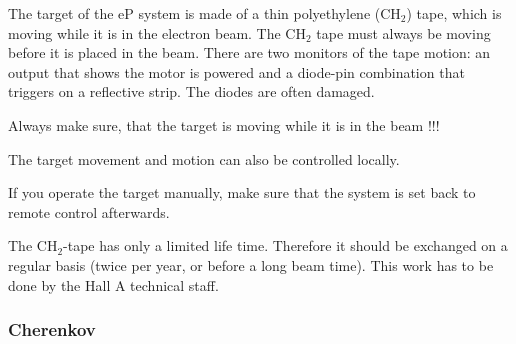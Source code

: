 {The target of the eP system is made of a thin polyethylene (CH$_2$) tape, which 
is moving while it is in the electron beam. 
The CH$_2$ tape  must always be moving before 
it is placed in the beam. There are two monitors of the tape motion:
an output that shows the motor is powered and a diode-pin combination 
that triggers on a reflective strip. The diodes are often damaged.\\
\begin{safetyen}{10}{5}
Always make sure, that the target is moving while it is in the beam !!!\\
\end{safetyen}
The target movement and motion can also be controlled locally.
\\
\begin{safetyen}{10}{5}
If you operate the target manually, make sure that the system
is set back to remote control afterwards.\\
\end{safetyen}
The CH$_2$-tape has only a limited life time. Therefore it
should be exchanged on a regular basis (twice per year, or 
before a long beam time). This work has to be done by the 
Hall A technical staff. 
\clearpage

\subsubsection{Cherenkov}
\label{sec:ep_cer}

}
